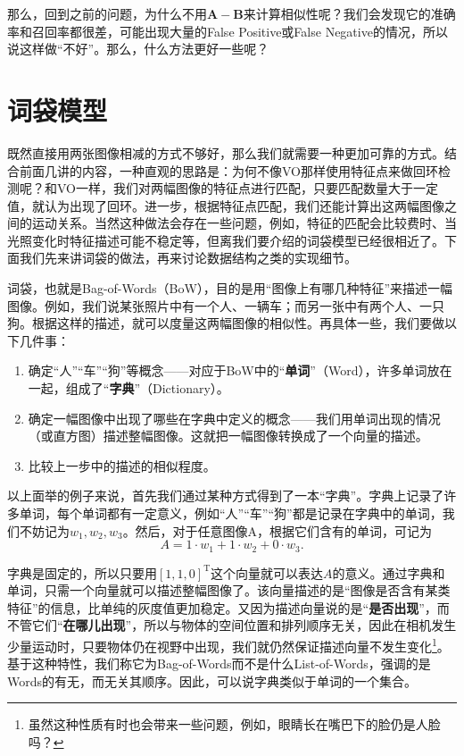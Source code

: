 那么，回到之前的问题，为什么不用$\bm{A}-\bm{B}$来计算相似性呢？我们会发现它的准确率和召回率都很差，可能出现大量的False Positive或False Negative的情况，所以说这样做“不好”。那么，什么方法更好一些呢？

\section{词袋模型}
既然直接用两张图像相减的方式不够好，那么我们就需要一种更加可靠的方式。结合前面几讲的内容，一种直观的思路是：为何不像VO那样使用特征点来做回环检测呢？和VO一样，我们对两幅图像的特征点进行匹配，只要匹配数量大于一定值，就认为出现了回环。进一步，根据特征点匹配，我们还能计算出这两幅图像之间的运动关系。当然这种做法会存在一些问题，例如，特征的匹配会比较费时、当光照变化时特征描述可能不稳定等，但离我们要介绍的词袋模型已经很相近了。下面我们先来讲词袋的做法，再来讨论数据结构之类的实现细节。

词袋，也就是Bag-of-Words（BoW），目的是用“图像上有哪几种特征”来描述一幅图像。例如，我们说某张照片中有一个人、一辆车；而另一张中有两个人、一只狗。根据这样的描述，就可以度量这两幅图像的相似性。再具体一些，我们要做以下几件事：

\begin{enumerate}
	\item 确定“人”“车”“狗”等概念——对应于BoW中的“\textbf{单词}”（Word），许多单词放在一起，组成了“\textbf{字典}”（Dictionary）。
	\item 确定一幅图像中出现了哪些在字典中定义的概念——我们用单词出现的情况（或直方图）描述整幅图像。这就把一幅图像转换成了一个向量的描述。
	\item 比较上一步中的描述的相似程度。
\end{enumerate}

以上面举的例子来说，首先我们通过某种方式得到了一本“字典”。字典上记录了许多单词，每个单词都有一定意义，例如“人”“车”“狗”都是记录在字典中的单词，我们不妨记为$w_1, w_2, w_3$。然后，对于任意图像A，根据它们含有的单词，可记为
\begin{equation}
A = 1 \cdot w_1+1\cdot w_2 + 0 \cdot w_3.
\end{equation}

字典是固定的，所以只要用$[1,1,0]^\mathrm{T}$这个向量就可以表达$A$的意义。通过字典和单词，只需一个向量就可以描述整幅图像了。该向量描述的是“图像是否含有某类特征”的信息，比单纯的灰度值更加稳定。又因为描述向量说的是“\textbf{是否出现}”，而不管它们“\textbf{在哪儿出现}”，所以与物体的空间位置和排列顺序无关，因此在相机发生少量运动时，只要物体仍在视野中出现，我们就仍然保证描述向量不发生变化\footnote{虽然这种性质有时也会带来一些问题，例如，眼睛长在嘴巴下的脸仍是人脸吗？}。 基于这种特性，我们称它为Bag-of-Words而不是什么List-of-Words，强调的是Words的有无，而无关其顺序。因此，可以说字典类似于单词的一个集合。

